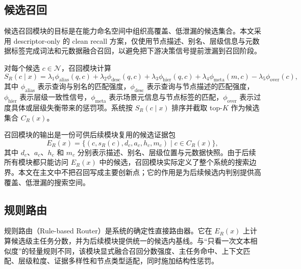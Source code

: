 \documentclass[11pt,a4paper]{ctexart}
\begin{document}
\subsection{候选召回}

候选召回模块的目标是在能力命名空间中组织高覆盖、低泄漏的候选集合。本文采用 descriptor-only 的 clean recall 方案，仅使用节点描述、别名、层级信息与元数据标签完成词法和元数据融合召回，以避免把下游决策信号提前泄漏到召回阶段。

对每个候选 $c\in\mathcal{N}$，召回模块计算
\begin{equation}
S_R(c\mid x)=\lambda_1 \phi_{\text{alias}}(q,c)+\lambda_2 \phi_{\text{desc}}(q,c)+\lambda_3 \phi_{\text{hier}}(q,c)+\lambda_4 \phi_{\text{meta}}(m,c)-\lambda_5 \phi_{\text{over}}(c),
\end{equation}
其中 $\phi_{\text{alias}}$ 表示查询与别名的匹配强度，$\phi_{\text{desc}}$ 表示查询与节点描述的匹配强度，$\phi_{\text{hier}}$ 表示层级一致性信号，$\phi_{\text{meta}}$ 表示场景元信息与节点标签的匹配，$\phi_{\text{over}}$ 表示过度具体或层级失衡带来的惩罚项。系统按 $S_R(c\mid x)$ 排序并截取 top-$K$ 作为候选集合 $C_R(x)$。

召回模块的输出是一份可供后续模块复用的候选证据包
\begin{equation}
E_R(x)=\{(c, s_R(c), d_c, a_c, h_c, m_c)\mid c\in C_R(x)\},
\end{equation}
其中 $d_c$、$a_c$、$h_c$ 和 $m_c$ 分别表示描述、别名、层级位置与元数据快照。由于后续所有模块都只能访问 $E_R(x)$ 中的候选，召回模块实际定义了整个系统的搜索边界。本文在主文中不把召回写成主要创新点；它的作用是为后续候选内判别提供高覆盖、低泄漏的搜索空间。

\subsection{规则路由}

规则路由（Rule-based Router）是系统的确定性直接路由器。它在 $E_R(x)$ 上计算候选级主任务分数，并为后续模块提供统一的候选内基线。与“只看一次文本相似度”的轻量规则不同，该模块显式融合召回分数强度、主任务命中、上下文匹配、层级粒度、证据多样性和节点类型适配，同时施加结构性惩罚。
\end{document}
